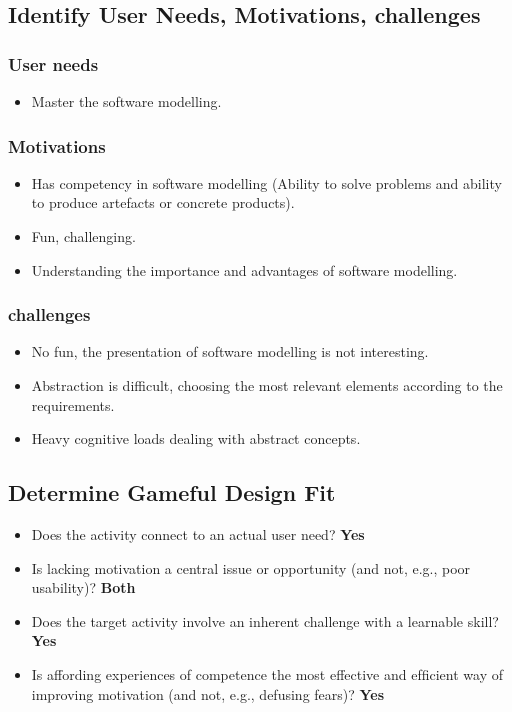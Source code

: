 \documentclass[12pt, a4paper]{report}
\begin{document}
{\begin{appendices}
\subsection{Identify User Needs, Motivations, challenges}
\subsubsection{User needs}
\begin{itemize}
\item Master the software modelling.
\end{itemize}
\subsubsection{Motivations}
\begin{itemize}
\item Has competency in software modelling (Ability to solve problems and ability to produce artefacts or concrete products).
\item Fun, challenging.
\item Understanding the importance and advantages of software modelling.
\end{itemize}
\subsubsection{challenges}
\begin{itemize}
\item No fun, the presentation of software modelling is not interesting.
\item Abstraction is difficult, choosing the most relevant elements according to the requirements.
\item Heavy cognitive loads dealing with abstract concepts.
\end{itemize}

\subsection{Determine Gameful Design Fit}
\begin{itemize}
\item Does the activity connect to an actual user need? \textbf{Yes}
\item Is lacking motivation a central issue or opportunity (and not, e.g., poor usability)? \textbf{Both}
\item Does the target activity involve an inherent challenge with a learnable skill? \textbf{Yes}
\item Is affording experiences of competence the most effective and efﬁcient way of improving motivation (and not, e.g., defusing fears)? \textbf{Yes}
\end{itemize}


\end{appendices}}
\end{document}
